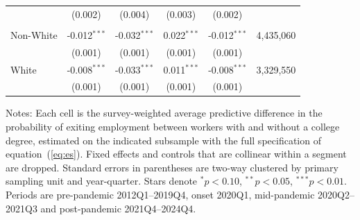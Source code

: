 \begin{table}[H]
\begin{threeparttable}
\begin{tabular}{lccccr}
 & (0.002) & (0.004) & (0.003) & (0.002) & \\
\addlinespace\multicolumn{6}{l}{\textit{Race}} \\
\quad Non-White & -0.012$^{***}$ & -0.032$^{***}$ & 0.022$^{***}$ & -0.012$^{***}$ & 4,435,060 \\
 & (0.001) & (0.001) & (0.001) & (0.001) & \\
\quad White & -0.008$^{***}$ & -0.033$^{***}$ & 0.011$^{***}$ & -0.008$^{***}$ & 3,329,550 \\
 & (0.001) & (0.001) & (0.001) & (0.001) & \\
\bottomrule
\end{tabular}
\begin{tablenotes}[flushleft]\footnotesize
\item Notes: Each cell is the survey-weighted average predictive difference in the probability of exiting employment between workers with and without a college degree, estimated on the indicated subsample with the full specification of equation~(\ref{eq:es}). Fixed effects and controls that are collinear within a segment are dropped. Standard errors in parentheses are two-way clustered by primary sampling unit and year-quarter. Stars denote $^{*}p<0.10$, $^{**}p<0.05$, $^{***}p<0.01$. Periods are pre-pandemic 2012Q1--2019Q4, onset 2020Q1, mid-pandemic 2020Q2--2021Q3 and post-pandemic 2021Q4--2024Q4.
\end{tablenotes}
\end{threeparttable}
\end{table}
